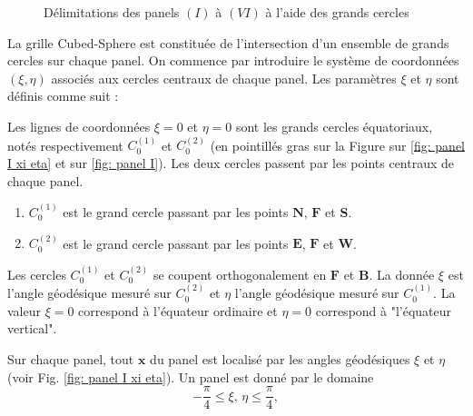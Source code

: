 \begin{figure}[htbp]
\begin{center}
\end{center}
\caption{Délimitations des panels $(I)$ à $(VI)$ à l'aide des grands cercles}
\label{fig: panel I to VI}
\end{figure}

La grille Cubed-Sphere est constituée de l'intersection d'un ensemble de grands cercles sur chaque panel. On commence par introduire le système de coordonnées $(\xi,\eta)$ associés aux cercles centraux de chaque panel. Les paramètres $\xi$ et  $\eta$ sont définis comme suit :

\begin{definition}
Les lignes de coordonnées $\xi = 0$ et $\eta = 0$ sont les grands cercles équatoriaux, notés respectivement $C_0^{(1)}$ et $C_0^{(2)}$ (en pointillés gras sur la Figure sur \ref{fig: panel I xi eta} et sur \ref{fig: panel I}).  Les deux cercles passent par les points centraux de chaque panel. 

\begin{enumerate}
\item $C_0^{(1)}$ est le grand cercle passant par les points $\mathbf{N}$, $\mathbf{F}$ et $\mathbf{S}$.

\item $C_0^{(2)}$ est le grand cercle passant par les points $\mathbf{E}$, $\mathbf{F}$ et $\mathbf{W}$.
\end{enumerate} 
Les cercles $C_0^{(1)}$ et $C_0^{(2)}$ se coupent orthogonalement en $\mathbf{F}$ et $\mathbf{B}$. La donnée
 $\xi$ est l'angle géodésique mesuré sur $C_0^{(2)}$ et $\eta$ l'angle géodésique mesuré sur $C_0^{(1)}$. La valeur $\xi = 0$ correspond à l'équateur ordinaire et $\eta=0$ correspond à "l'équateur vertical".
\end{definition}

Sur chaque panel, tout $\mathbf{x}$ du panel est localisé par les angles géodésiques $\xi$ et $\eta$  (voir Fig. \ref{fig: panel I xi eta}).
Un panel est donné par le domaine
\begin{equation}
- \dfrac{\pi}{4} \leq \xi\text{, }\eta \leq \dfrac{\pi}{4},
\end{equation}

